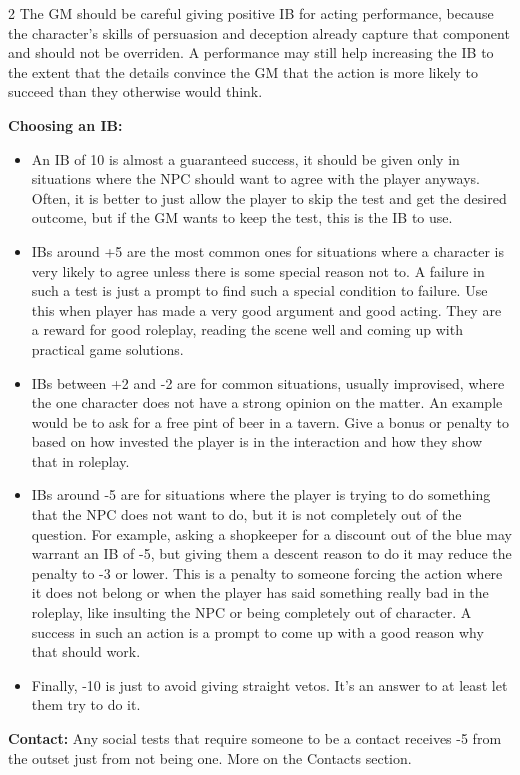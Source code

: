 \begin{multicols}{2}
The GM should be careful giving positive IB for acting performance, because the character's skills of persuasion and deception already capture that component and should not be overriden. A performance may still help increasing the IB to the extent that the details convince the GM that the action is more likely to succeed than they otherwise would think.  

\textbf{Choosing an IB:} 

\begin{itemize}
  \item An IB of 10 is almost a guaranteed success, it should be given only in situations where the NPC should want to agree with the player anyways. Often, it is better to just allow the player to skip the test and get the desired outcome, but if the GM wants to keep the test, this is the IB to use.
  \item IBs around +5 are the most common ones for situations where a character is very likely to agree unless there is some special reason not to. A failure in such a test is just a prompt to find such a special condition to failure. Use this when player has made a very good argument and good acting. They are a reward for good roleplay, reading the scene well and coming up with practical game solutions.
  \item IBs between +2 and -2 are for common situations, usually improvised, where the one character does not have a strong opinion on the matter. An example would be to ask for a free pint of beer in a tavern. Give a bonus or penalty to based on how invested the player is in the interaction and how they show that in roleplay.
  \item IBs around -5 are for situations where the player is trying to do something that the NPC does not want to do, but it is not completely out of the question. For example, asking a shopkeeper for a discount out of the blue may warrant an IB of -5, but giving them a descent reason to do it may reduce the penalty to -3 or lower. This is a penalty to someone forcing the action where it does not belong or when the player has said something really bad in the roleplay, like insulting the NPC or being completely out of character. A success in such an action is a prompt to come up with a good reason why that should work.
  \item Finally, -10 is just to avoid giving straight vetos. It's an answer to at least let them try to do it.
\end{itemize}

\textbf{Contact:} Any social tests that require someone to be a contact receives -5 from the outset just from not being one. More on the Contacts section.


\end{multicols}
